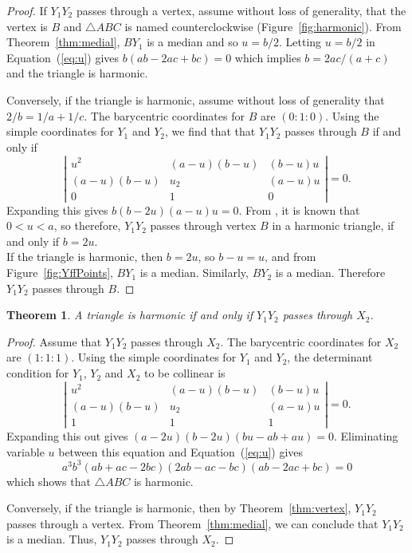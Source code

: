 \documentclass[12pt,a4paper]{amsart}
\newtheorem{theorem}{Theorem} [section]
\begin{document}
\begin{proof}
If $Y_1Y_2$ passes through a vertex, assume
without loss of generality, that the vertex is $B$
and $\triangle ABC$ is named counterclockwise (Figure~\ref{fig:harmonic}).
From Theorem~\ref{thm:medial}, $BY_1$ is a median and so $u=b/2$.
Letting $u=b/2$ in Equation~(\ref{eq:u}) gives $b(ab-2ac+bc)=0$ which implies $b=2ac/(a+c)$
and the triangle is harmonic.

Conversely, if the triangle is harmonic, assume without loss of generality that $2/b=1/a+1/c$.
The barycentric coordinates for $B$ are $(0:1:0)$.
Using the simple coordinates for $Y_1$ and $Y_2$,
we find that that $Y_1Y_2$ passes through $B$ if and only if
$$\left|
\begin{array}{ccc}
u^2&(a-u)(b-u)&(b-u)u\\
(a-u)(b-u)&u_2&(a-u)u\\
0&1&0
\end{array}
\right|=0.$$
Expanding this gives $b (b - 2 u) (a - u) u=0$.
From  \cite{Yff}, it is known that $0<u<a$, so therefore,
$Y_1Y_2$ passes through vertex $B$ in a harmonic triangle, if and only if $b=2u$.\\
If the triangle is harmonic, then $b=2u$, so $b-u=u$, and from Figure~\ref{fig:YffPoints},
$BY_1$ is a median. Similarly, $BY_2$ is a median.
Therefore $Y_1Y_2$ passes through $B$.
\end{proof}

\begin{theorem}
\label{thm:X2}
A triangle is harmonic if and only if $Y_1Y_2$ passes through $X_2$.
\end{theorem}

\begin{proof}
Assume that $Y_1Y_2$ passes through $X_2$.
The barycentric coordinates for $X_2$ are  $(1:1:1)$. Using the simple coordinates for $Y_1$ and $Y_2$,
the determinant condition for $Y_1$, $Y_2$ and $X_2$ to be collinear is
$$\left|
\begin{array}{ccc}
u^2&(a-u)(b-u)&(b-u)u\\
(a-u)(b-u)&u_2&(a-u)u\\
1&1&1
\end{array}
\right|=0.$$
Expanding this out gives $(a - 2 u) (b - 2 u) (b u -ab + au)=0$. Eliminating variable $u$ between this equation and 
Equation~(\ref{eq:u}) gives
$$a^3 b^3 (a b+a c-2 b c) (2 a b-a c-b c) (a b-2 a c+b c)=0$$
which shows that $\triangle ABC$ is harmonic.

Conversely, if the triangle is harmonic, then by Theorem~\ref{thm:vertex}, $Y_1Y_2$
passes through a vertex. From Theorem~\ref{thm:medial}, we can conclude that $Y_1Y_2$ is a median.
Thus, $Y_1Y_2$ passes through $X_2$.
\end{proof}
\end{document}

